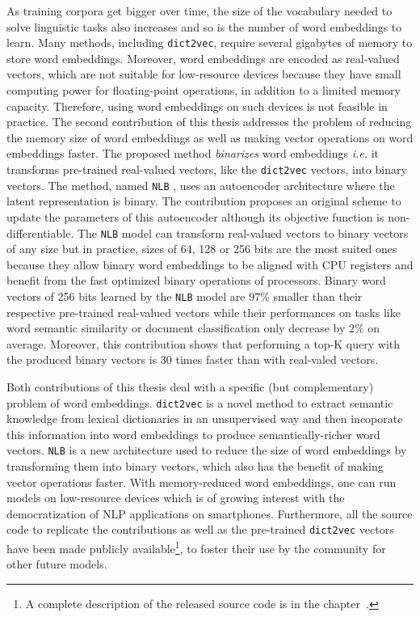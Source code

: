   As training corpora get bigger over time, the size of the vocabulary needed to
  solve linguistic tasks also increases and so is the number of word embeddings
  to learn. Many methods, including \texttt{dict2vec}, require several gigabytes
  of memory to store word embeddings. Moreover, word embeddings are encoded as
  real-valued vectors, which are not suitable for low-resource devices because
  they have small computing power for floating-point operations, in addition to
  a limited memory capacity. Therefore, using word embeddings on such devices is
  not feasible in practice. The second contribution of this thesis addresses the
  problem of reducing the memory size of word embeddings as well as making
  vector operations on word embeddings faster. The proposed method
  \textit{binarizes} word embeddings \textit{i.e.} it transforms pre-trained
  real-valued vectors, like the \texttt{dict2vec} vectors, into binary vectors.
  The method, named \texttt{NLB} \citep{tissier2019near}, uses an autoencoder
  architecture where the latent representation is binary. The contribution
  proposes an original scheme to update the parameters of this autoencoder
  although its objective function is non-differentiable. The \texttt{NLB} model
  can transform real-valued vectors to binary vectors of any size but in
  practice, sizes of 64, 128 or 256 bits are the most suited ones because they
  allow binary word embeddings to be aligned with CPU registers and benefit from
  the fast optimized binary operations of processors. Binary word vectors of 256
  bits learned by the \texttt{NLB} model are $97\%$ smaller than their
  respective pre-trained real-valued vectors while their performances on tasks
  like word semantic similarity or document classification only decrease by
  $2\%$ on average. Moreover, this contribution shows that performing a top-K
  query with the produced binary vectors is 30 times faster than with real-valed
  vectors. \medskip

  Both contributions of this thesis deal with a specific (but complementary)
  problem of word embeddings. \texttt{dict2vec} is a novel method to extract
  semantic knowledge from lexical dictionaries in an unsupervised way and then
  incoporate this information into word embeddings to produce
  semantically-richer word vectors. \texttt{NLB} is a new architecture used to
  reduce the size of word embeddings by transforming them into binary vectors,
  which also has the benefit of making vector operations faster. With
  memory-reduced word embeddings, one can run models on low-resource devices
  which is of growing interest with the democratization of NLP applications on
  smartphones. Furthermore, all the source code to replicate the contributions
  as well as the pre-trained \texttt{dict2vec} vectors have been made publicly
  available\footnote{A complete description of the released source code is in
  the chapter~\textit{}.}, to foster their use by the
  community for other future models.

